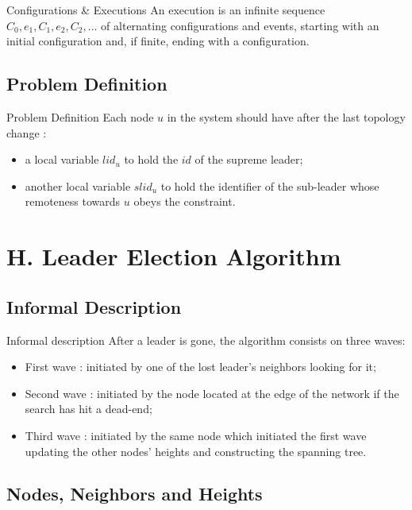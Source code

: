\documentclass{beamer}
\begin{document}
\begin{frame}{Configurations \& Executions}
	An execution is an infinite sequence $C_0, e_1 ,C_1, e_2, C_2 , ...$ of alternating configurations and events, starting with an initial configuration and, if finite, ending with a configuration.
\end{frame}


\subsection{Problem Definition}
\begin{frame}{Problem Definition}
Each node $u$ in the system should have after the last topology change :
\begin{itemize}
	\item a local variable $lid_{u}$ to hold the $id$ of the supreme leader;
	\item another local variable $slid_u$ to hold the identifier of the sub-leader whose remoteness towards $u$ obeys the constraint.
\end{itemize}
\end{frame}

\section{H. Leader Election Algorithm}
\subsection{Informal Description}
\begin{frame}{Informal description}
After a leader is gone, the algorithm consists on three waves:
\pause
\begin{itemize}
	\item First wave : initiated by one of the lost leader's neighbors looking for it;
	\item Second wave : initiated by the node located at the edge of the network if the search has hit a dead-end;
	\item Third wave : initiated by the same node which initiated the first wave updating the other nodes' heights and constructing the spanning tree.
\end{itemize}

\end{frame}

\subsection{Nodes, Neighbors and Heights}
\end{document}
